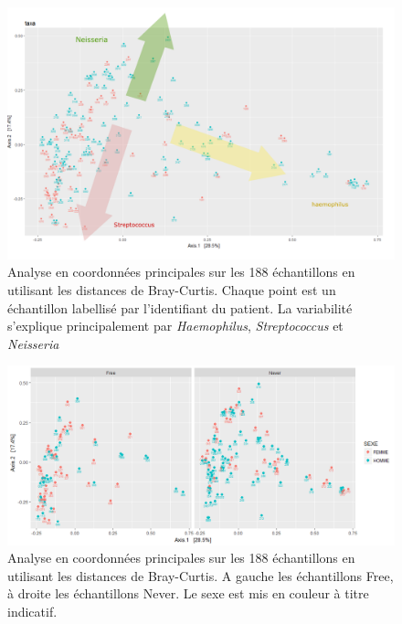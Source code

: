 \documentclass[12pt,a4paper]{article}
\begin{document}
\begin{figure}
\begin{center}
\includegraphics[scale=0.50]{img/Capture.png}\hfill
\end{center}
\caption{Analyse en coordonnées principales sur les 188 échantillons en utilisant les distances de Bray-Curtis. Chaque point est un échantillon labellisé par l'identifiant du patient. La variabilité s'explique principalement par \textit{Haemophilus}, \textit{Streptococcus} et \textit{Neisseria}}
\label{ordination2}
\end{figure}


\begin{figure}
\begin{center}
\includegraphics[scale=0.62]{img/oordination_new.png}\hfill
\end{center}
\caption{Analyse en coordonnées principales sur les 188 échantillons en utilisant les distances de Bray-Curtis. A gauche les échantillons Free, à droite les échantillons Never. Le sexe est mis en couleur à titre indicatif.}
\label{ordination}
\end{figure}
\end{document}

